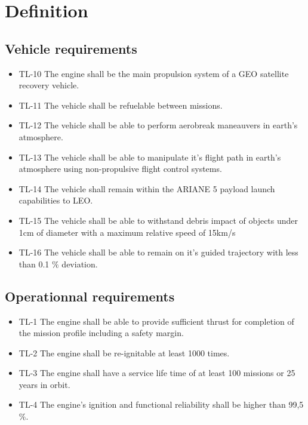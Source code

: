 \chapter{Definition}
\section{Vehicle requirements}
\begin{itemize}
    \item TL-10 The engine shall be the main propulsion system of a GEO satellite recovery vehicle.

    \item TL-11 The vehicle shall be refuelable between missions.

    \item TL-12 The vehicle shall be able to perform aerobreak maneauvers in earth's atmosphere.

    \item TL-13 The vehicle shall be able to manipulate it's flight path in earth's atmosphere using non-propulsive flight control systems.

    \item TL-14 The vehicle shall remain within the ARIANE 5 payload launch capabilities to LEO.

    \item TL-15 The vehicle shall be able to withstand debris impact of objects under 1cm of diameter with a maximum relative speed of 15km/s

    \item TL-16 The vehicle shall be able to remain on it's guided trajectory with less than 0.1 $\%$ deviation.
\end{itemize}{}


\section{Operationnal requirements}
\begin{itemize}
    \item TL-1 The engine shall be able to provide sufficient thrust for completion of the mission profile including a safety margin.

    \item TL-2 The engine shall be re-ignitable at least 1000 times.

    \item TL-3 The engine shall have a service life time of at least 100 missions or 25 years in orbit.

    \item TL-4 The engine's ignition and functional reliability shall be higher than 99,5$\%$.
\end{itemize}

